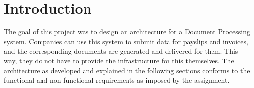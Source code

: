 \section{Introduction}\label{sec:introduction}

The goal of this project was to design an architecture for a Document Processing system. Companies can use this system to submit data for payslips and invoices, and the corresponding documents are generated and delivered for them. This way, they do not have to provide the infrastructure for this themselves. The architecture as developed and explained in the following sections conforms to the functional and non-functional requirements as imposed by the assignment.
